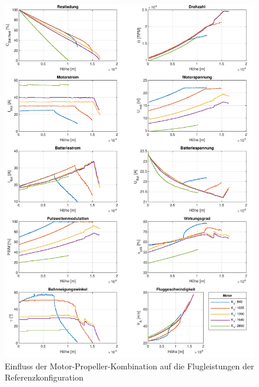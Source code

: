 \begin{figure}[H]
\centering
	\includegraphics[scale=0.7]{Diagramme/Flaechenflzg_Mot_Prop.pdf}
	\caption{Einfluss der Motor-Propeller-Kombination auf die Flugleistungen der Referenzkonfiguration}
	\label{abb:flaechenflzg_mot_prop}
\end{figure}

